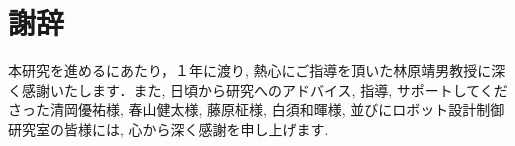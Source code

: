 \chapter*{謝辞}

本研究を進めるにあたり，１年に渡り, 熱心にご指導を頂いた林原靖男教授に深く感謝いたします．また, 日頃から研究へのアドバイス, 指導, サポートしてくださった清岡優祐様, 春山健太様, 藤原柾様, 白須和暉様, 並びにロボット設計制御研究室の皆様には, 心から深く感謝を申し上げます. 
%
